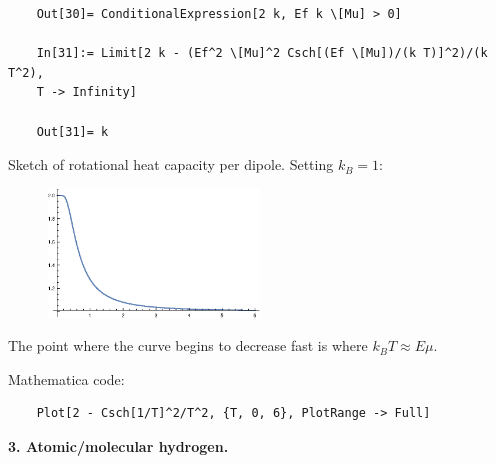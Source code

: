 \documentclass{article}
\theoremstyle{definition}
\begin{document}
\begin{enumerate}[label=(\alph*)]
\begin{lstlisting}
	Out[30]= ConditionalExpression[2 k, Ef k \[Mu] > 0]
	
	In[31]:= Limit[2 k - (Ef^2 \[Mu]^2 Csch[(Ef \[Mu])/(k T)]^2)/(k T^2), 
	T -> Infinity]
	
	Out[31]= k
	\end{lstlisting}
	
	
	Sketch of rotational heat capacity per dipole. Setting $k_B = 1$:
	\begin{figure}[!htb]
		\centering
		\includegraphics[width=0.5\textwidth]{problem2.eps}
	\end{figure}
	The point where the curve begins to decrease fast is where $k_BT \approx E\mu$.

	Mathematica code:
	\begin{lstlisting}
	Plot[2 - Csch[1/T]^2/T^2, {T, 0, 6}, PlotRange -> Full]
	\end{lstlisting}
	
\end{enumerate}



\noindent \textbf{3. Atomic/molecular hydrogen.}
\end{document}
